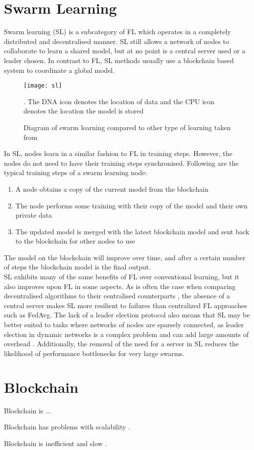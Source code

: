 \section{Swarm Learning}
Swarm learning (SL) \cite{swarm_learning} is a subcategory of FL which operates in a completely distributed and decentralised manner. SL still allows a network of nodes to collaborate to learn a shared model, but at no point is a central server used or a leader chosen. In contrast to FL, SL methods usually use a blockchain based system to coordinate a global model.

\begin{figure}[h]
	\texttt{[image: sl]}
	\caption{Diagram of swarm learning compared to other type of learning taken from \cite{swarm_learning}}. The DNA icon denotes the location of data and the CPU icon denotes the location the model is stored
	\label{fig_learning}
\end{figure}


In SL, nodes learn in a similar fashion to FL in training steps. However, the nodes do not need to have their training steps synchronised. Following are the typical training steps of a swarm learning node:
\begin{enumerate}
	\item A node obtains a copy of the current model from the blockchain
	\item The node performs some training with their copy of the model and their own private data
	\item The updated model is merged with the latest blockchain model and sent back to the blockchain for other nodes to use
\end{enumerate}
The model on the blockchain will improve over time, and after a certain number of steps the blockchain model is the final output. \\

SL exhibits many of the same benefits of FL over conventional learning, but it also improves upon FL in some aspects. As is often the case when comparing decentralised algorithms to their centralised counterparts \cite{swarm_resil}, the absence of a central server makes SL more resilient to failures than centralized FL approaches such as FedAvg. The lack of a leader election protocol also means that SL may be better suited to tasks where networks of nodes are sparsely connected, as leader election in dynamic networks is a complex problem and can add large amounts of overhead \cite{leaderelection}. Additionally, the removal of the need for a server in SL reduces the likelihood of performance bottlenecks for very large swarms.

\section{Blockchain}
Blockchain is ... \cite{blockchain_review}

Blockchain has problems with scalability \cite{blockchain_scale}.

Blockchain is inefficient and slow \cite{blockchain_scale}.